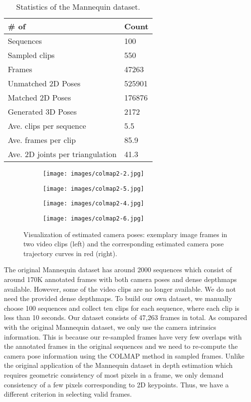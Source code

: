 \documentclass{article}
\begin{document}
\begin{table}[h]
\centering
\begin{tabular}{ll} \hline \hline
        \# of & Count \\ \hline
        Sequences & 100 \\
        Sampled clips & 550 \\
        Frames & 47263 \\ \hline
        Unmatched 2D Poses & 525901 \\
        Matched 2D Poses & 176876 \\
        Generated 3D Poses & 2172 \\ \hline
        Ave. clips per sequence & 5.5 \\
        Ave. frames per clip & 85.9 \\
        Ave. 2D joints per triangulation & 41.3 \\ \hline \hline
\end{tabular}
\caption{Statistics of the Mannequin dataset.}\label{tab:stats}
\end{table}


\begin{figure}[h]
\centering
\begin{subfigure}[b]{0.49\textwidth}
\texttt{[image: images/colmap2-2.jpg]}
\end{subfigure}
\begin{subfigure}[b]{0.35\textwidth}
\texttt{[image: images/colmap2-5.jpg]}
\end{subfigure}
\begin{subfigure}[b]{0.49\textwidth}
\texttt{[image: images/colmap2-4.jpg]}
\end{subfigure}
\begin{subfigure}[b]{0.35\textwidth}
\texttt{[image: images/colmap2-6.jpg]}
\end{subfigure}
\caption{Visualization of estimated camera poses: exemplary image frames
in two video clips (left) and the corresponding estimated camera pose
trajectory curves in red (right).} \label{fig:colmap}
\end{figure}


The original Mannequin dataset \cite{li2019learning} has
around 2000 sequences which consist of around 170K annotated frames with
both camera poses and dense depthmaps available. However, some of the
video clips are no longer available.  We do not need the provided dense
depthmaps. To build our own dataset, we manually choose 100 sequences
and collect ten clips for each sequence, where each clip is less than 10
seconds. Our dataset consists of 47,263 frames in total. As compared
with the original Mannequin dataset, we only use the camera
intrinsics information. This is because our re-sampled frames have very
few overlaps with the annotated frames in the original sequences and we
need to re-compute the camera pose information using the COLMAP method
\cite{schonberger2016pixelwise} in sampled frames. Unlike the original
application of the Mannequin dataset in depth estimation which
requires geometric consistency of most pixels in a frame, we only demand
consistency of a few pixels corresponding to 2D keypoints. Thus, we have
a different criterion in selecting valid frames. 
\end{document}
